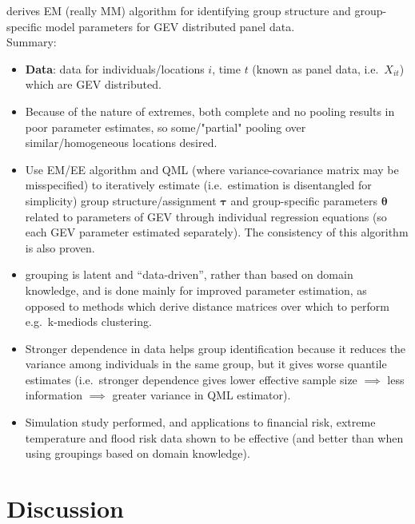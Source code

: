 \documentclass{article}
\numberwithin{equation}{section}
\begin{document}
\cite{Dupuis2023} derives EM (really MM) algorithm for identifying group structure and group-specific model parameters for GEV distributed panel data. \\
Summary:
\begin{itemize}
  \item \textbf{Data}: data for individuals/locations $i$, time $t$ (known as panel data, i.e.\ $X_{i t}$) which are GEV distributed. 
  \item Because of the nature of extremes, both complete and no pooling results in poor parameter estimates, so some/"partial" pooling over similar/homogeneous locations desired.
  \item Use EM/EE algorithm and QML (where variance-covariance matrix may be misspecified) to iteratively estimate (i.e.\ estimation is disentangled for simplicity) group structure/assignment $\bm{\tau}$ and group-specific parameters $\bm{\theta}$ related to parameters of GEV through individual regression equations (so each GEV parameter estimated separately). 
  The consistency of this algorithm is also proven.
  \item grouping is latent and ``data-driven'', rather than based on domain knowledge, and is done mainly for improved parameter estimation, as opposed to methods which derive distance matrices over which to perform e.g.\ k-mediods clustering. 
  \item Stronger dependence in data helps group identification because it reduces the variance among individuals in the same group, but it gives worse quantile estimates (i.e.\ stronger dependence gives lower effective sample size $\implies$ less information $\implies$ greater variance in QML estimator).
  \item Simulation study performed, and applications to financial risk, extreme temperature and flood risk data shown to be effective (and better than when using groupings based on domain knowledge). 
\end{itemize}

\section{Discussion} \label{sec:discussion}
\end{document}
